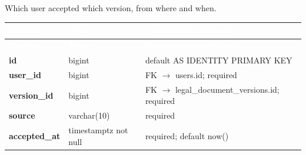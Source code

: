 \subsection*{}
Which user accepted which version, from where and when.\par\vspace{2pt}
{\tabfont\rowband
\begin{longtable}{@{}>{\raggedright\arraybackslash}p{}>{\raggedright\arraybackslash}p{}>{\raggedright\arraybackslash}p{}@{}}
\rowcolor{najdanavy}\textcolor{white}{\sffamily\bfseries\small Column} & \textcolor{white}{\sffamily\bfseries\small Type} & \textcolor{white}{\sffamily\bfseries\small Constraints and notes}\\
\endfirsthead
\rowcolor{najdanavy}\textcolor{white}{\sffamily\bfseries\small Column} & \textcolor{white}{\sffamily\bfseries\small Type} & \textcolor{white}{\sffamily\bfseries\small Constraints and notes}\\
\endhead
\bottomrule\endlastfoot
\textbf{id} & bigint & default AS IDENTITY PRIMARY KEY\\
\textbf{user\_\allowbreak{}id} & bigint & FK $\rightarrow$ users.id; required\\
\textbf{version\_\allowbreak{}id} & bigint & FK $\rightarrow$ legal\_\allowbreak{}document\_\allowbreak{}versions.id; required\\
\textbf{source} & varchar(10) & required\\
\textbf{accepted\_\allowbreak{}at} & timestamptz not null & required; default now()\\
\end{longtable}}

